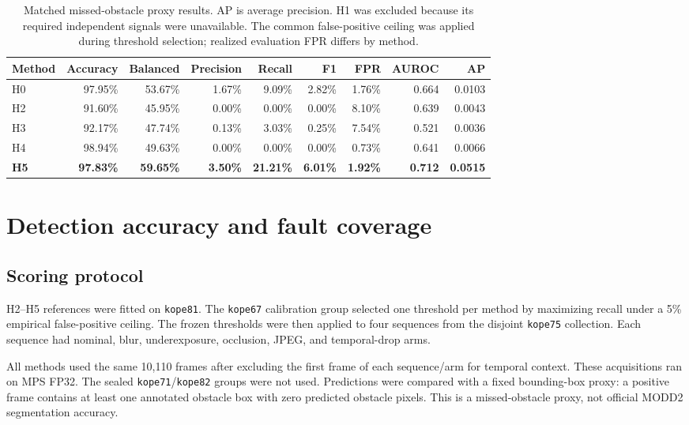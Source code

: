 \documentclass[sigconf,nonacm]{acmart}
\begin{document}
\begin{table}[t]
\centering\small
\caption{Matched missed-obstacle proxy results. AP is average precision. H1 was excluded because its required independent signals were unavailable. The common false-positive ceiling was applied during threshold selection; realized evaluation FPR differs by method.}
\begin{tabularx}{\textwidth}{@{}Xrrrrrrrr@{}}
\toprule
Method & Accuracy & Balanced & Precision & Recall & F1 & FPR & AUROC & AP\\
\midrule
H0 & 97.95\% & 53.67\% & 1.67\% & 9.09\% & 2.82\% & 1.76\% & 0.664 & 0.0103\\
H2 & 91.60\% & 45.95\% & 0.00\% & 0.00\% & 0.00\% & 8.10\% & 0.639 & 0.0043\\
H3 & 92.17\% & 47.74\% & 0.13\% & 3.03\% & 0.25\% & 7.54\% & 0.521 & 0.0036\\
H4 & 98.94\% & 49.63\% & 0.00\% & 0.00\% & 0.00\% & 0.73\% & 0.641 & 0.0066\\
\textbf{H5} & \textbf{97.83\%} & \textbf{59.65\%} & \textbf{3.50\%} & \textbf{21.21\%} & \textbf{6.01\%} & \textbf{1.92\%} & \textbf{0.712} & \textbf{0.0515}\\
\bottomrule
\end{tabularx}
\end{table}

\section{Detection accuracy and fault coverage}

\subsection{Scoring protocol}
H2--H5 references were fitted on \texttt{kope81}. The \texttt{kope67} calibration group selected one threshold per method by maximizing recall under a 5\% empirical false-positive ceiling. The frozen thresholds were then applied to four sequences from the disjoint \texttt{kope75} collection. Each sequence had nominal, blur, underexposure, occlusion, JPEG, and temporal-drop arms.

All methods used the same 10,110 frames after excluding the first frame of each sequence/arm for temporal context. These acquisitions ran on MPS FP32. The sealed \texttt{kope71}/\texttt{kope82} groups were not used. Predictions were compared with a fixed bounding-box proxy: a positive frame contains at least one annotated obstacle box with zero predicted obstacle pixels. This is a missed-obstacle proxy, not official MODD2 segmentation accuracy.
\end{document}

